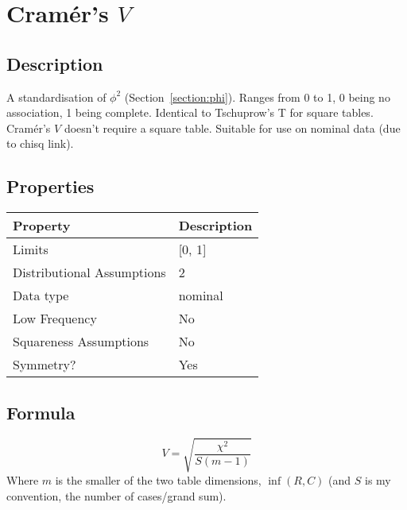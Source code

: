 \documentclass[11pt]{article}
\begin{document}
\section{Cram\'er's $V$}
\label{section:cramersv}
\subsection{Description}
A standardisation of $\phi^2$ (Section~\ref{section:phi}).  
Ranges from 0 to 1, 0 being no association, 1 being complete.  
Identical to Tschuprow's T for square tables.  
Cram\'er's $V$ doesn't require a square table.  
Suitable for use on nominal data (due to chisq link).

\subsection{Properties}
\begin{tabular}{| l || l |}
    \hline
    {\bf Property} & {\bf Description} \\
    \hline
    Limits & [0, 1] \\ \hline

    Distributional Assumptions& 2 \\ \hline

    Data type & nominal \\ \hline

    Low Frequency & No \\ \hline

    Squareness Assumptions & No \\ \hline
    
    Symmetry? & Yes \\ \hline

\end{tabular}


\subsection{Formula}
$$
V = \sqrt{ \frac{ \chi^2 }{ S( m - 1 )} }
$$
Where $m$ is the smaller of the two table dimensions, $\inf(R, C)$  (and $S$ is my convention, the number of cases/grand sum).
\end{document}
